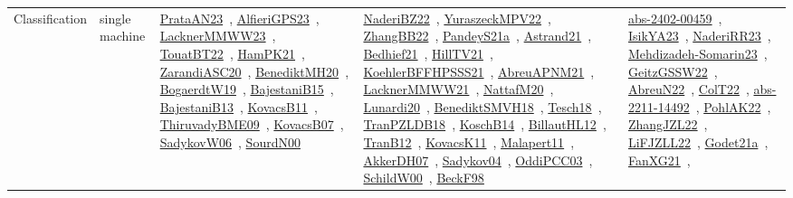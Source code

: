 {\begin{longtable}{lp{3cm}>{\raggedright\arraybackslash}p{6cm}>{\raggedright\arraybackslash}p{6cm}>{\raggedright\arraybackslash}p{8cm}}
Classification & single machine & \href{works/PrataAN23.pdf}{PrataAN23}~\cite{PrataAN23}, \href{works/AlfieriGPS23.pdf}{AlfieriGPS23}~\cite{AlfieriGPS23}, \href{works/LacknerMMWW23.pdf}{LacknerMMWW23}~\cite{LacknerMMWW23}, \href{works/TouatBT22.pdf}{TouatBT22}~\cite{TouatBT22}, \href{works/HamPK21.pdf}{HamPK21}~\cite{HamPK21}, \href{works/ZarandiASC20.pdf}{ZarandiASC20}~\cite{ZarandiASC20}, \href{works/BenediktMH20.pdf}{BenediktMH20}~\cite{BenediktMH20}, \href{works/BogaerdtW19.pdf}{BogaerdtW19}~\cite{BogaerdtW19}, \href{works/BajestaniB15.pdf}{BajestaniB15}~\cite{BajestaniB15}, \href{works/BajestaniB13.pdf}{BajestaniB13}~\cite{BajestaniB13}, \href{works/KovacsB11.pdf}{KovacsB11}~\cite{KovacsB11}, \href{works/ThiruvadyBME09.pdf}{ThiruvadyBME09}~\cite{ThiruvadyBME09}, \href{works/KovacsB07.pdf}{KovacsB07}~\cite{KovacsB07}, \href{works/SadykovW06.pdf}{SadykovW06}~\cite{SadykovW06}, \href{works/SourdN00.pdf}{SourdN00}~\cite{SourdN00} & \href{works/NaderiBZ22.pdf}{NaderiBZ22}~\cite{NaderiBZ22}, \href{works/YuraszeckMPV22.pdf}{YuraszeckMPV22}~\cite{YuraszeckMPV22}, \href{works/ZhangBB22.pdf}{ZhangBB22}~\cite{ZhangBB22}, \href{works/PandeyS21a.pdf}{PandeyS21a}~\cite{PandeyS21a}, \href{works/Astrand21.pdf}{Astrand21}~\cite{Astrand21}, \href{works/Bedhief21.pdf}{Bedhief21}~\cite{Bedhief21}, \href{works/HillTV21.pdf}{HillTV21}~\cite{HillTV21}, \href{works/KoehlerBFFHPSSS21.pdf}{KoehlerBFFHPSSS21}~\cite{KoehlerBFFHPSSS21}, \href{works/AbreuAPNM21.pdf}{AbreuAPNM21}~\cite{AbreuAPNM21}, \href{works/LacknerMMWW21.pdf}{LacknerMMWW21}~\cite{LacknerMMWW21}, \href{works/NattafM20.pdf}{NattafM20}~\cite{NattafM20}, \href{works/Lunardi20.pdf}{Lunardi20}~\cite{Lunardi20}, \href{works/BenediktSMVH18.pdf}{BenediktSMVH18}~\cite{BenediktSMVH18}, \href{works/Tesch18.pdf}{Tesch18}~\cite{Tesch18}, \href{works/TranPZLDB18.pdf}{TranPZLDB18}~\cite{TranPZLDB18}, \href{works/KoschB14.pdf}{KoschB14}~\cite{KoschB14}, \href{works/BillautHL12.pdf}{BillautHL12}~\cite{BillautHL12}, \href{works/TranB12.pdf}{TranB12}~\cite{TranB12}, \href{works/KovacsK11.pdf}{KovacsK11}~\cite{KovacsK11}, \href{works/Malapert11.pdf}{Malapert11}~\cite{Malapert11}, \href{works/AkkerDH07.pdf}{AkkerDH07}~\cite{AkkerDH07}, \href{works/Sadykov04.pdf}{Sadykov04}~\cite{Sadykov04}, \href{works/OddiPCC03.pdf}{OddiPCC03}~\cite{OddiPCC03}, \href{works/SchildW00.pdf}{SchildW00}~\cite{SchildW00}, \href{works/BeckF98.pdf}{BeckF98}~\cite{BeckF98} & \href{works/abs-2402-00459.pdf}{abs-2402-00459}~\cite{abs-2402-00459}, \href{works/IsikYA23.pdf}{IsikYA23}~\cite{IsikYA23}, \href{works/NaderiRR23.pdf}{NaderiRR23}~\cite{NaderiRR23}, \href{works/Mehdizadeh-Somarin23.pdf}{Mehdizadeh-Somarin23}~\cite{Mehdizadeh-Somarin23}, \href{works/GeitzGSSW22.pdf}{GeitzGSSW22}~\cite{GeitzGSSW22}, \href{works/AbreuN22.pdf}{AbreuN22}~\cite{AbreuN22}, \href{works/ColT22.pdf}{ColT22}~\cite{ColT22}, \href{works/abs-2211-14492.pdf}{abs-2211-14492}~\cite{abs-2211-14492}, \href{works/PohlAK22.pdf}{PohlAK22}~\cite{PohlAK22}, \href{works/ZhangJZL22.pdf}{ZhangJZL22}~\cite{ZhangJZL22}, \href{works/LiFJZLL22.pdf}{LiFJZLL22}~\cite{LiFJZLL22}, \href{works/Godet21a.pdf}{Godet21a}~\cite{Godet21a}, \href{works/FanXG21.pdf}{FanXG21}~\cite{FanXG21}, 
\end{longtable}}
